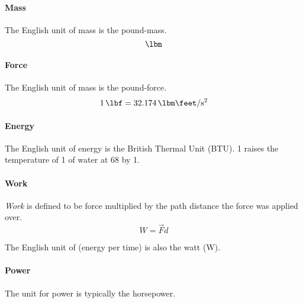 \paragraph{Mass}\label{par:English_Mass}
The English unit of mass is the pound-mass.
\begin{equation*}
  \si{\lbm}
\end{equation*}

\paragraph{Force}\label{par:English_Force}
The English unit of mass is the pound-force.
\begin{equation*}
  \SI{1}{\lbf} = \SI[per-mode=symbol]{32.174}{\lbm\feet\per\second\squared}
\end{equation*}

\paragraph{Energy}\label{par:English_Energy}
The English unit of energy is the British Thermal Unit (BTU).
\SI{1}{\btu} raises the temperature of \SI{1}{\lbm} of water at \SI{68}{\degreeF} by \SI{1}{\degreeF}.

\paragraph{Work}\label{par:English_Work}
\begin{definition}[Work]\label{def:Work}
  \emph{Work} is defined to be force multiplied by the path distance the force was applied over.
  \begin{equation}\label{eq:Work}
    W = \vec{F} d
  \end{equation}
\end{definition}

The English unit of  (energy per time) is also the watt (\si{\watt}).

\paragraph{Power}\label{par:English_Power}
The unit for power is typically the horsepower.

